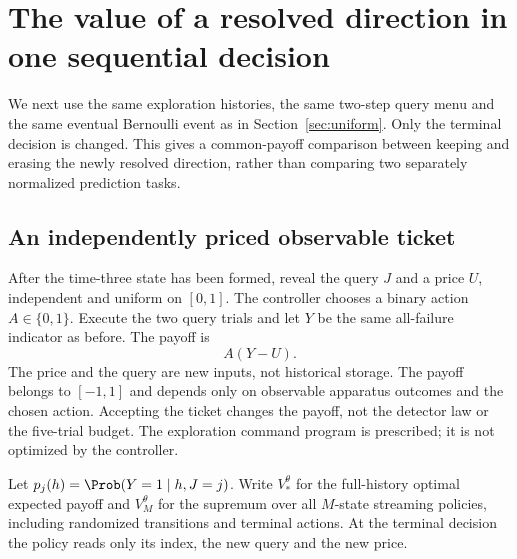 \section{The value of a resolved direction in one sequential decision}\label{sec:resolved-value}
We next use the same exploration histories, the same two-step query menu
and the same eventual Bernoulli event as in Section~\ref{sec:uniform}.
Only the terminal decision is changed. This gives a common-payoff
comparison between keeping and erasing the newly resolved direction,
rather than comparing two separately normalized prediction tasks.

\subsection{An independently priced observable ticket}
After the time-three state has been formed, reveal the query $J$ and a
price $U$, independent and uniform on $[0,1]$. The controller chooses a
binary action $A\in\{0,1\}$. Execute the two query trials and let $Y$
be the same all-failure indicator as before. The payoff is
\begin{equation}\label{eq:ticket-payoff}
 A(Y-U).
\end{equation}
The price and the query are new inputs, not historical storage. The
payoff belongs to $[-1,1]$ and depends only on observable apparatus
outcomes and the chosen action. Accepting the ticket changes the payoff,
not the detector law or the five-trial budget. The exploration command
program is prescribed; it is not optimized by the controller.

Let $p_j(h)=\Prob(Y=1\mid h,J=j)$. Write $V_*^\theta$ for the
full-history optimal expected payoff and $V_M^\theta$ for the supremum
over all $M$-state streaming policies, including randomized transitions
and terminal actions. At the terminal decision the policy reads only its
index, the new query and the new price.

